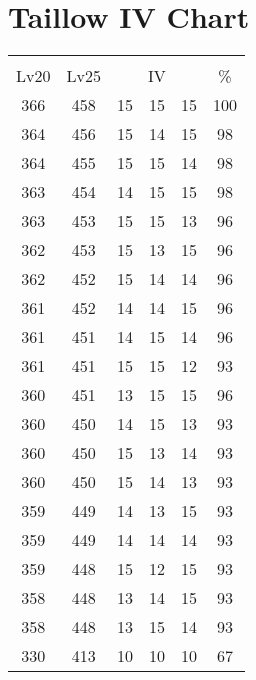 \documentclass{article}%
\begin{document}
%
\normalsize%
\section{Taillow IV Chart}%
\label{sec:Taillow IV Chart}%
\renewcommand{\arraystretch}{1.5}%
\begin{tabular}{|c|c|c|c|c|c|}%
\hline%
\multicolumn{6}{|c|}{\textcolor{white}{ 
\linebreak{Taillow}
}%
\cellcolor{black}}\\%
\multicolumn{1}{|c}{Lv20}&\multicolumn{1}{c|}{Lv25}&\multicolumn{3}{c|}{IV}&\multicolumn{1}{|c|}{\%}\\%
\hline%
\rowcolor{color100}%
366&458&15&15&15&100\\%
\hline%
\rowcolor{color98}%
364&456&15&14&15&98\\%
\hline%
\rowcolor{color98}%
364&455&15&15&14&98\\%
\hline%
\rowcolor{color98}%
363&454&14&15&15&98\\%
\hline%
\rowcolor{color96}%
363&453&15&15&13&96\\%
\hline%
\rowcolor{color96}%
362&453&15&13&15&96\\%
\hline%
\rowcolor{color96}%
362&452&15&14&14&96\\%
\hline%
\rowcolor{color96}%
361&452&14&14&15&96\\%
\hline%
\rowcolor{color96}%
361&451&14&15&14&96\\%
\hline%
\rowcolor{color93}%
361&451&15&15&12&93\\%
\hline%
\rowcolor{color96}%
360&451&13&15&15&96\\%
\hline%
\rowcolor{color93}%
360&450&14&15&13&93\\%
\hline%
\rowcolor{color93}%
360&450&15&13&14&93\\%
\hline%
\rowcolor{color93}%
360&450&15&14&13&93\\%
\hline%
\rowcolor{color93}%
359&449&14&13&15&93\\%
\hline%
\rowcolor{color93}%
359&449&14&14&14&93\\%
\hline%
\rowcolor{color93}%
359&448&15&12&15&93\\%
\hline%
\rowcolor{color93}%
358&448&13&14&15&93\\%
\hline%
\rowcolor{color93}%
358&448&13&15&14&93\\%
\hline%
\rowcolor{color91}%
330&413&10&10&10&67\\%
\end{tabular}

%
\end{document}
